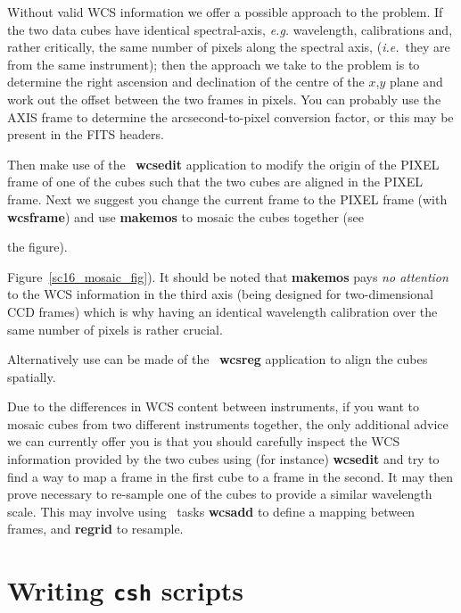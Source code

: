 \documentclass[twoside,11pt]{article}
\newcommand{\xref}[3]{#1}
\newcommand{\xlabel}[1]{}
\newcommand{\latex}[1]{#1}
\begin{document}
{Without valid WCS information we offer a possible approach to the
problem.  If the two data cubes have identical spectral-axis,
\emph{e.g.} wavelength, calibrations and, rather critically, the same
number of pixels along the spectral axis, (\emph{i.e.}\ they are from
the same instrument); then the approach we take to the problem is to
determine the right ascension and declination of the centre of the
$x$,$y$ plane and work out the offset between the two frames in
pixels.  You can probably use the AXIS frame to determine the
arcsecond-to-pixel conversion factor, or this may be present in the
FITS headers.

Then make use of the \CCDPACK\ \xref{{\bf wcsedit}}{sun139}{WCSEDIT}
application to modify the origin of the PIXEL frame of one of the
cubes such that the two cubes are aligned in the PIXEL frame.  Next
we suggest you change the current frame to the PIXEL frame (with 
\xref{{\bf wcsframe}}{sun95}{WCSFRAME}) and use
\xref{{\bf makemos}}{sun139}{MAKEMOS} to mosaic the cubes together (see
\begin{htmlonly}
the figure).
\end{htmlonly}
\latex{Figure~\ref{sc16_mosaic_fig}).}  It should be noted that {\bf makemos} pays
{\em no attention} to the WCS information in the third axis (being
designed for two-dimensional CCD frames) which is why having an
identical wavelength calibration over the same number of pixels is
rather crucial.

Alternatively use can be made of the \CCDPACK\ 
\xref{{\bf wcsreg}}{sun139}{WCSREG} application to align the cubes spatially.

Due to the differences in WCS content between instruments, if you want
to mosaic cubes from two different instruments together, the only
additional advice we can currently offer you is that you should
carefully inspect the WCS information provided by the two cubes using
(for instance) \xref{{\bf wcsedit}}{sun139}{WCSEDIT} and try to find a way
to map a frame in the first cube to a frame in the second.  It may
then prove necessary to re-sample one of the cubes to provide a
similar wavelength scale.  This may involve using \KAPPA\ tasks
\xref{{\bf wcsadd}}{sun95}{WCSADD} to define a mapping between frames,
and \xref{{\bf regrid}}{sun95}{REGRID} to resample.

\newpage
\section{\xlabel{sc16_writingcsh}Writing {\tt csh} scripts\label{sc16_writingcsh}}

}
\end{document}
